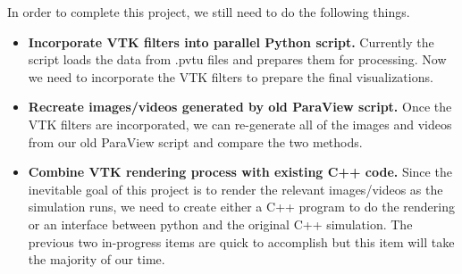 In order to complete this project, we still need to do the following things.

\begin{itemize}
	\item \textbf{Incorporate VTK filters into parallel Python script.} Currently the script loads the data from .pvtu files and prepares them for processing. Now we need to incorporate the VTK filters to prepare the final visualizations.
	\item \textbf{Recreate images/videos generated by old ParaView script.} Once the VTK filters are incorporated, we can re-generate all of the images and videos from our old ParaView script and compare the two methods.
	\item \textbf{Combine VTK rendering process with existing C++ code.} Since the inevitable goal of this project is to render the relevant images/videos as the simulation runs, we need to create either a C++ program to do the rendering or an interface between python and the original C++ simulation. The previous two in-progress items are quick to accomplish but this item will take the majority of our time.
\end{itemize}